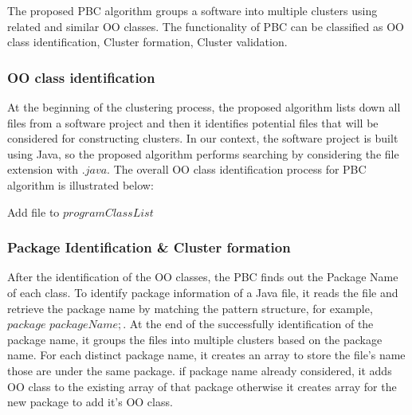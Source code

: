 \documentclass[12pt]{report}
\begin{document}
The proposed PBC algorithm groups a software into multiple clusters using related and similar OO classes. The functionality of PBC can be classified as OO class identification, Cluster formation, Cluster validation.

\subsubsection{OO class identification}

At the beginning of the clustering process, the proposed algorithm lists down all files from a software project and then it identifies potential files that will be considered for constructing clusters.  In our context, the software project is built using Java, so the proposed algorithm performs searching by considering the file extension with $.java$. 
The overall OO class identification process for PBC algorithm is illustrated below:   
\begin{algorithm}
\label{OO_class_identification}
\begin{algorithmic}[1]

				\STATE Add file to $programClassList$
		\ENDIF
	\ENDFOR

\end{algorithmic}
\end{algorithm}


\subsubsection{ Package Identification \&  Cluster formation}

After the identification of the OO classes, the PBC finds out the Package Name of each class. To identify package information of a Java file, it reads the file and retrieve the package name by matching the pattern structure, for example, $package$ $packageName;$. At the end of the successfully identification of the package name, it groups the files into multiple clusters based on the package name. For each distinct package name, it creates an array to store the file's name those are under the same package. if package name already considered, it adds OO class to the existing array of that package otherwise it creates array for the new package to add it's OO class.
\end{document}
